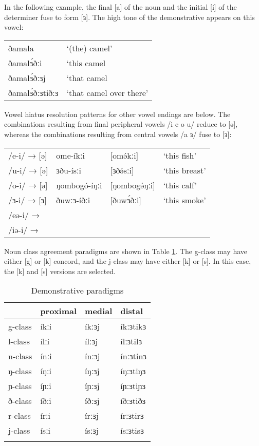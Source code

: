 In the following example, the final [a] of the noun and the initial [i] of the determiner fuse to form [ɜ]. The high tone of the demonstrative appears on this vowel:

\ea  \begin{tabular}[t]{ll}
	ðamala		&	`(the) camel'\\ 
	ðamalɜ́ðːi	&	`this camel\\
	ðamalɜ́ðːɜj	&	`that camel\\
	ðamalɜ́ðːɜtiðːɜ	&	`that camel over there’	\\
  \end{tabular}
\z 

Vowel hiatus resolution patterns for other vowel endings are below. The combinations resulting from final peripheral vowels /i e o u/ reduce to [ə], whereas the combinations resulting from central vowels /a ɜ/ fuse to [ɜ]:

\ea \begin{tabular}[t]{llll}
/e-i/ → [ə] &	ome-íkːi 	& [omə́kːi] 		& ‘this fish’\\
/u-i/ → [ə]	& ɜðu-ísːi 		& [ɜðə́sːi] 		& ‘this breast’\\
/o-i/ → [ə]	& ŋombogó-íŋːi 	& [ŋombogə́ŋːi]	& ‘this calf’\\
/ɜ-i/ → [ɜ]	& ðuwːɜ-íðːi 	& [ðuwɜ́ðːi] 	& ‘this smoke’\\
/eə-i/ → & & & \\
/iə-i/ → & & & \\	
 \end{tabular}
\z 
Noun class agreement paradigms are shown in Table \ref{tab:ch8:2}. The g-class may have either [g] or [k] concord, and the j-class may have either [k] or [s]. In this case, the [k] and [s] versions are selected. %

\begin{table}
\begin{tabular}[t]{llll}
	\lsptoprule
		& proximal	&	medial	&	distal\\
\midrule		
g-class	&	íkːi	&	íkːɜj	&	íkːɜtikɜ\\
l-class	&	ílːi	&	ílːɜj	&	ílːɜtilɜ\\
n-class	&	ínːi	&	ínːɜj	&	ínːɜtinɜ\\
ŋ-class	&	íŋːi	&	íŋːɜj	&	íŋːɜtiŋɜ\\
ɲ-class	&	íɲːi	&	íɲːɜj	&	íɲːɜtiɲɜ\\
ð-class	&	íðːi	&	íðːɜj	&	íðːɜtiðɜ\\
r-class	&	írːi	&	írːɜj	&	írːɜtirɜ\\
j-class &	ísːi 	&	ísːɜj	&	ísːɜtisɜ\\
\lspbottomrule
	\end{tabular}
  \caption{Demonstrative paradigms}
  \label{tab:ch8:2}
\end{table}

